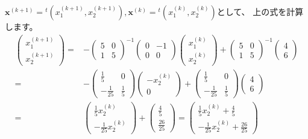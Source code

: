 \documentclass[12pt,b5paper]{ltjsarticle}
\begin{document}
\begin{enumerate}
       $\bm{x}^{(k+1)}={}^{t}(x_1^{(k+1)},x_2^{(k+1)}),
       \bm{x}^{(k)}={}^{t}(x_1^{(k)},x_2^{(k)})$として、
       上の式を計算します。
       \begin{align}
        \begin{pmatrix}x_1^{(k+1)}\\x_2^{(k+1)}\end{pmatrix}
        =&
        - \begin{pmatrix} 5 & 0 \\ 1 & 5 \end{pmatrix}^{-1}
        \begin{pmatrix}0&-1\\0&0\end{pmatrix}
        \begin{pmatrix}x_1^{(k)}\\x_2^{(k)}\end{pmatrix}
        +\begin{pmatrix} 5 & 0 \\ 1 & 5 \end{pmatrix}^{-1}
        \begin{pmatrix}4\\6\end{pmatrix}\\
        =& -\begin{pmatrix} \frac{1}{5} & 0 \\ -\frac{1}{25} & \frac{1}{5} \end{pmatrix}
        \begin{pmatrix}-x_2^{(k)}\\0\end{pmatrix}
        +\begin{pmatrix} \frac{1}{5} & 0 \\ -\frac{1}{25} & \frac{1}{5} \end{pmatrix}
        \begin{pmatrix}4\\6\end{pmatrix}\\
        =& \begin{pmatrix} \frac{1}{5}x_2^{(k)} \\ -\frac{1}{25}x_2^{(k)} \end{pmatrix}
        +\begin{pmatrix} \frac{4}{5} \\ \frac{26}{25} \end{pmatrix}
        = \begin{pmatrix}
          \frac{1}{5}x_2^{(k)} + \frac{4}{5} \\
          -\frac{1}{25}x_2^{(k)} +\frac{26}{25}
          \end{pmatrix}
       \end{align}


\end{enumerate}
\end{document}
